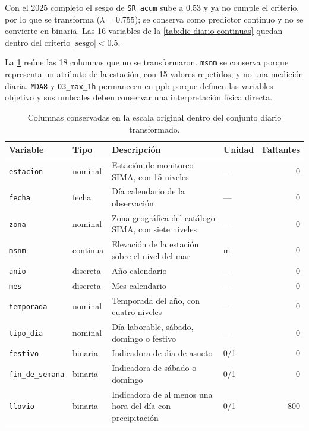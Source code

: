 Con el 2025 completo el sesgo de \texttt{SR\_acum} sube a 0.53 y ya no
cumple el criterio, por lo que se transforma ($\lambda=0.755$); se conserva
como predictor continuo y no se convierte en binaria. Las 16 variables de la
\cref{tab:dic-diario-continuas} quedan dentro del criterio
$|\mathrm{sesgo}|<0.5$.

La \cref{tab:dic-diario-originales} reúne las 18 columnas que no se
transformaron. \texttt{msnm} se conserva porque representa un atributo de la
estación, con 15 valores repetidos, y no una medición diaria. \texttt{MDA8} y
\texttt{O3\_max\_1h} permanecen en ppb porque definen las variables objetivo y
sus umbrales deben conservar una interpretación física directa.

\begin{table}[t]
  \centering
  \caption{Columnas conservadas en la escala original dentro del conjunto
    diario transformado.}
  \label{tab:dic-diario-originales}
  \footnotesize
  \setlength{\tabcolsep}{4pt}
  \begin{tabular}{llp{8.0cm}lr}
    \toprule
    Variable & Tipo & Descripción & Unidad & Faltantes \\
    \midrule
    \texttt{estacion} & nominal & Estación de monitoreo SIMA, con 15 niveles
      & --- & 0 \\
    \texttt{fecha} & fecha & Día calendario de la observación
      & --- & 0 \\
    \texttt{zona} & nominal & Zona geográfica del catálogo SIMA, con siete
      niveles & --- & 0 \\
    \texttt{msnm} & continua & Elevación de la estación sobre el nivel del mar
      & m & 0 \\
    \texttt{anio} & discreta & Año calendario
      & --- & 0 \\
    \texttt{mes} & discreta & Mes calendario
      & --- & 0 \\
    \texttt{temporada} & nominal & Temporada del año, con cuatro niveles
      & --- & 0 \\
    \texttt{tipo\_dia} & nominal & Día laborable, sábado, domingo o festivo
      & --- & 0 \\
    \texttt{festivo} & binaria & Indicadora de día de asueto
      & 0/1 & 0 \\
    \texttt{fin\_de\_semana} & binaria & Indicadora de sábado o domingo
      & 0/1 & 0 \\
    \texttt{llovio} & binaria & Indicadora de al menos una hora del día con
      precipitación & 0/1 & 800 \\

\end{tabular}
\end{table}
